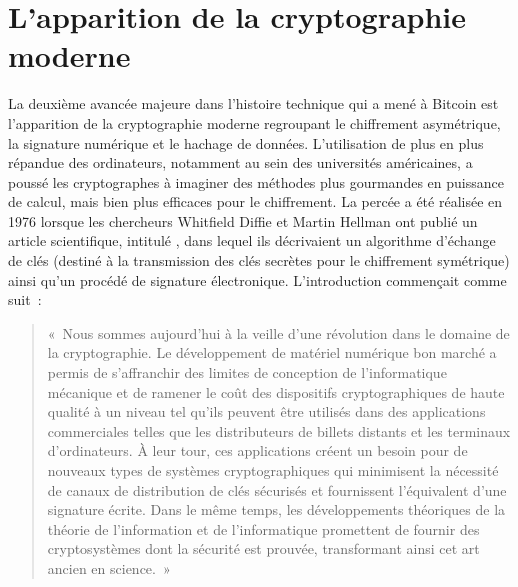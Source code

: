 \section*{L'apparition de la cryptographie moderne} %

La deuxième avancée majeure dans l'histoire technique qui a mené à Bitcoin est l'apparition de la cryptographie moderne regroupant le chiffrement asymétrique, la signature numérique et le hachage de données. L'utilisation de plus en plus répandue des ordinateurs, notamment au sein des universités américaines, a poussé les cryptographes à imaginer des méthodes plus gourmandes en puissance de calcul, mais bien plus efficaces pour le chiffrement. La percée a été réalisée en 1976 lorsque les chercheurs Whitfield Diffie et Martin Hellman ont publié un article scientifique, intitulé , dans lequel ils décrivaient un algorithme d'échange de clés (destiné à la transmission des clés secrètes pour le chiffrement symétrique) ainsi qu'un procédé de signature électronique. L'introduction commençait comme suit~:

\begin{quote}
«~Nous sommes aujourd'hui à la veille d'une révolution dans le domaine de la cryptographie. Le développement de matériel numérique bon marché a permis de s'affranchir des limites de conception de l'informatique mécanique et de ramener le coût des dispositifs cryptographiques de haute qualité à un niveau tel qu'ils peuvent être utilisés dans des applications commerciales telles que les distributeurs de billets distants et les terminaux d'ordinateurs. À leur tour, ces applications créent un besoin pour de nouveaux types de systèmes cryptographiques qui minimisent la nécessité de canaux de distribution de clés sécurisés et fournissent l'équivalent d'une signature écrite. Dans le même temps, les développements théoriques de la théorie de l'information et de l'informatique promettent de fournir des cryptosystèmes dont la sécurité est prouvée, transformant ainsi cet art ancien en science.~»
\end{quote} %

